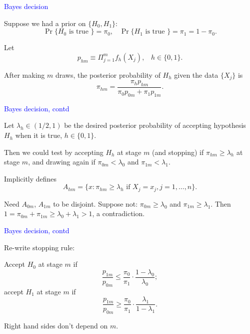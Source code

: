 \documentclass[landscape]{slides}
\newcommand{\beq}{\begin{equation}}
\newcommand{\eeq}{\end{equation}}
\begin{document}
\begin{slide}
{\textcolor{blue}{Bayes decision}}

Suppose we had a prior on $\{H_0, H_1\}$:
\beq
   \Pr\{ H_0 \mbox{ is true }\} = \pi_0, \;\;\;  \Pr\{ H_1 \mbox{ is true }\} = \pi_1 = 1- \pi_0.
\eeq

Let 
\beq
    p_{hm} \equiv \Pi_{j=1}^m f_h (X_j), \;\;\; h \in \{ 0, 1 \}.
\eeq

After making $m$ draws, the posterior probability of $H_h$ given the data $\{X_j\}$
is
\beq
  \pi_{hm} = \frac{\pi_h p_{hm}}{\pi_0 p_{0m} + \pi_1 p_{1m}}.
\eeq

\end{slide}

\begin{slide}
{\textcolor{blue}{Bayes decision, contd}}

Let $\lambda_h \in (1/2, 1)$ be the desired posterior probability of accepting
hypothesis $H_h$ when it is true, $h \in \{ 0, 1\}$.

Then we could test by accepting $H_h$ at stage $m$ (and stopping)
if $\pi_{hm} \ge \lambda_h$ at stage $m$, 
and drawing again if $\pi_{0m} < \lambda_0$ and $\pi_{1m} < \lambda_1$.

Implicitly defines 
\beq
   A_{hm} = \{ x: \pi_{hm} \ge \lambda_h \mbox{ if } X_j = x_j, j = 1, \ldots, n\}.
\eeq

Need $A_{0m}$, $A_{1m}$ to be disjoint.
Suppose not: $\pi_{0m} \ge \lambda_0$ and $\pi_{1m} \ge \lambda_1$.
Then $1 = \pi_{0m} + \pi_{1m} \ge \lambda_0 + \lambda_1 > 1$, a contradiction.


\end{slide}

\begin{slide}
{\textcolor{blue}{Bayes decision, contd}}

Re-write stopping rule:

Accept $H_0$ at stage $m$ if 
\beq
    \frac{p_{1m}}{p_{0m}} \le \frac{\pi_0}{\pi_1} \cdot \frac{1-\lambda_0}{\lambda_0};
\eeq
accept $H_1$ at stage $m$ if
\beq
    \frac{p_{1m}}{p_{0m}} \ge \frac{\pi_0}{\pi_1} \cdot \frac{\lambda_1}{1-\lambda_1}.
\eeq

Right hand sides don't depend on $m$.  

\end{slide}
\end{document}
